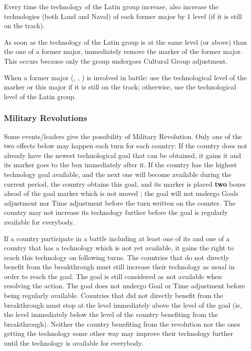 \aparag Every time the technology of the Latin group increase, also increase
the technologies (both Land and Naval) of each former major by 1 level (if it
is still on the track).

\aparag As soon as the technology of the Latin group is at the same level (or
above) than the one of a former major, immediately remove the marker of the
former major. This occurs because only the group undergoes Cultural Group
adjustment.

\aparag When a former major (\paysPortugal, \paysVenise, \paysPologne) is
involved in battle:
\bparag use the technological level of the marker or this major if it is still
on the track;
\bparag otherwise, use the technological level of the Latin group.


\subsubsection{Military Revolutions}\label{chExpenses:Military Revolutions}
\aparag Some events/leaders give the possibility of Military Revolution. Only
one of the two effects below may happen each turn for each country:
\bparag[Catching up] If the country does not already have the newest
technological goal that can be obtained, it gains it and its marker goes to
the box immediately after it.
\bparag[Breakthrough] If the country has the highest technology goal
available, and the next one will become available during the current period,
the country obtains this goal, and its marker is placed \textbf{two} boxes
ahead of the goal marker which is not moved ; the goal will not undergo Goals
adjustment nor Time adjustment before the turn written on the counter. The
country may not increase its technology further before the goal is regularly
available for everybody.

 If a country participate in a battle including
at least one of its \ARMY and one \ARMY of a country that has a technology
which is not yet available, it gains the right to reach this technology on
following turns.
\bparag The countries that do not directly benefit from the breakthrough must
still increase their technology as usual in order to reach the goal.
\bparag The goal is still considered as not available when resolving the
action.
\bparag The goal does not undergo Goal or Time adjustment before being
regularly available.
\bparag Countries that did not directly benefit from the breakthrough must
stop at the level immediately above the level of the goal (ie, the level
immediately below the level of the country benefiting from the breakthrough).
\bparag Neither the country benefiting from the revolution nor the ones
getting the technology some other way may improve their technology further
until the technology is available for everybody.

